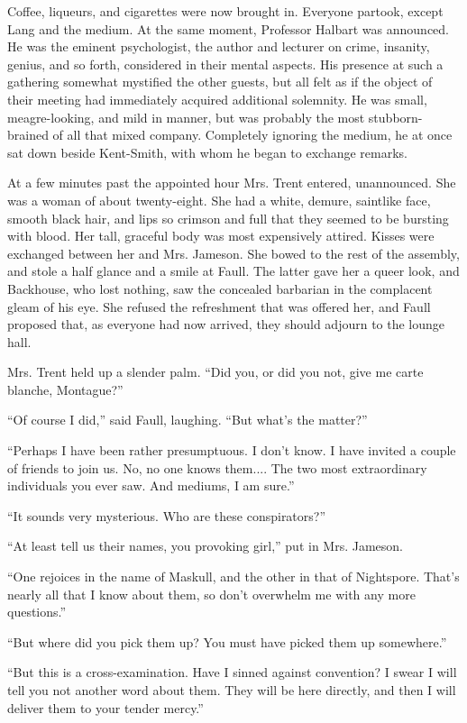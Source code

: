Coffee, liqueurs, and cigarettes were now brought in. Everyone partook, except Lang and the medium. At the same moment, Professor Halbart was announced. He was the eminent psychologist, the author and lecturer on crime, insanity, genius, and so forth, considered in their mental aspects. His presence at such a gathering somewhat mystified the other guests, but all felt as if the object of their meeting had immediately acquired additional solemnity. He was small, meagre-looking, and mild in manner, but was probably the most stubborn-brained of all that mixed company. Completely ignoring the medium, he at once sat down beside Kent-Smith, with whom he began to exchange remarks.

At a few minutes past the appointed hour Mrs. Trent entered, unannounced. She was a woman of about twenty-eight. She had a white, demure, saintlike face, smooth black hair, and lips so crimson and full that they seemed to be bursting with blood. Her tall, graceful body was most expensively attired. Kisses were exchanged between her and Mrs. Jameson. She bowed to the rest of the assembly, and stole a half glance and a smile at Faull. The latter gave her a queer look, and Backhouse, who lost nothing, saw the concealed barbarian in the complacent gleam of his eye. She refused the refreshment that was offered her, and Faull proposed that, as everyone had now arrived, they should adjourn to the lounge hall.

Mrs. Trent held up a slender palm. ``Did you, or did you not, give me carte blanche, Montague?''

``Of course I did,'' said Faull, laughing. ``But what's the matter?''

``Perhaps I have been rather presumptuous. I don't know. I have invited a couple of friends to join us. No, no one knows them.... The two most extraordinary individuals you ever saw. And mediums, I am sure.''

``It sounds very mysterious. Who are these conspirators?''

``At least tell us their names, you provoking girl,'' put in Mrs. Jameson.

``One rejoices in the name of Maskull, and the other in that of Nightspore. That's nearly all that I know about them, so don't overwhelm me with any more questions.''

``But where did you pick them up? You must have picked them up somewhere.''

``But this is a cross-examination. Have I sinned against convention? I swear I will tell you not another word about them. They will be here directly, and then I will deliver them to your tender mercy.''


